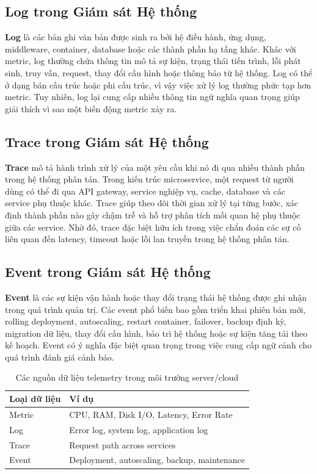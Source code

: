 \subsection*{Log trong Giám sát Hệ thống}
\textbf{Log} là các bản ghi văn bản được sinh ra bởi hệ điều hành, ứng dụng, middleware, container, database hoặc các thành phần hạ tầng khác. Khác với metric, log thường chứa thông tin mô tả sự kiện, trạng thái tiến trình, lỗi phát sinh, truy vấn, request, thay đổi cấu hình hoặc thông báo từ hệ thống. Log có thể ở dạng bán cấu trúc hoặc phi cấu trúc, vì vậy việc xử lý log thường phức tạp hơn metric. Tuy nhiên, log lại cung cấp nhiều thông tin ngữ nghĩa quan trọng giúp giải thích vì sao một biến động metric xảy ra.

\subsection*{Trace trong Giám sát Hệ thống}
\textbf{Trace} mô tả hành trình xử lý của một yêu cầu khi nó đi qua nhiều thành phần trong hệ thống phân tán. Trong kiến trúc microservice, một request từ người dùng có thể đi qua API gateway, service nghiệp vụ, cache, database và các service phụ thuộc khác. Trace giúp theo dõi thời gian xử lý tại từng bước, xác định thành phần nào gây chậm trễ và hỗ trợ phân tích mối quan hệ phụ thuộc giữa các service. Nhờ đó, trace đặc biệt hữu ích trong việc chẩn đoán các sự cố liên quan đến latency, timeout hoặc lỗi lan truyền trong hệ thống phân tán.

\subsection*{Event trong Giám sát Hệ thống}
\textbf{Event} là các sự kiện vận hành hoặc thay đổi trạng thái hệ thống được ghi nhận trong quá trình quản trị. Các event phổ biến bao gồm triển khai phiên bản mới, rolling deployment, autoscaling, restart container, failover, backup định kỳ, migration dữ liệu, thay đổi cấu hình, bảo trì hệ thống hoặc sự kiện tăng tải theo kế hoạch. Event có ý nghĩa đặc biệt quan trọng trong việc cung cấp ngữ cảnh cho quá trình đánh giá cảnh báo.

\begin{table}[h!]
    \centering
    \caption{Các nguồn dữ liệu telemetry trong môi trường server/cloud}
    \label{tab:server-cloud-telemetry}
    \renewcommand{\arraystretch}{1.3}
    \begin{tabular}{|p{3cm}|p{9cm}|}
        \hline
        \textbf{Loại dữ liệu} & \textbf{Ví dụ} \\
        \hline
        Metric & CPU, RAM, Disk I/O, Latency, Error Rate \\
        \hline
        Log & Error log, system log, application log \\
        \hline
        Trace & Request path across services \\
        \hline
        Event & Deployment, autoscaling, backup, maintenance \\
        \hline
    \end{tabular}
\end{table}

